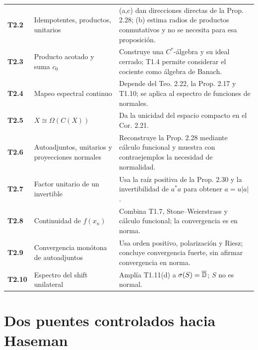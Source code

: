 \begin{longtable}{>{\bfseries}p{1.3cm}p{4.3cm}p{8.2cm}}
T2.2 & Idempotentes, productos, unitarios & (a,c) dan direcciones directas de la Prop. 2.28; (b) estima radios de productos conmutativos y no se necesita para esa proposición.\\
T2.3 & Producto acotado y suma $c_0$ & Construye una $C^*$-álgebra y su ideal cerrado; T1.4 permite considerar el cociente como álgebra de Banach.\\
T2.4 & Mapeo espectral continuo & Depende del Teo. 2.22, la Prop. 2.17 y T1.10; se aplica al espectro de funciones de normales.\\
T2.5 & $X\cong\Omega(C(X))$ & Da la unicidad del espacio compacto en el Cor. 2.21.\\
T2.6 & Autoadjuntos, unitarios y proyecciones normales & Reconstruye la Prop. 2.28 mediante cálculo funcional y muestra con contraejemplos la necesidad de normalidad.\\
T2.7 & Factor unitario de un invertible & Usa la raíz positiva de la Prop. 2.30 y la invertibilidad de $a^*a$ para obtener $a=u|a|$.\\
T2.8 & Continuidad de $f(x_n)$ & Combina T1.7, Stone--Weierstrass y cálculo funcional; la convergencia es en norma.\\
T2.9 & Convergencia monótona de autoadjuntos & Usa orden positivo, polarización y Riesz; concluye convergencia fuerte, sin afirmar convergencia en norma.\\
T2.10 & Espectro del shift unilateral & Amplía T1.11(d) a $\sigma(S)=\overline{\mathbb D}$; $S$ no es normal.\\
\bottomrule
\end{longtable}
\normalsize

\section{Dos puentes controlados hacia Haseman}

\begin{center}
\end{center}

